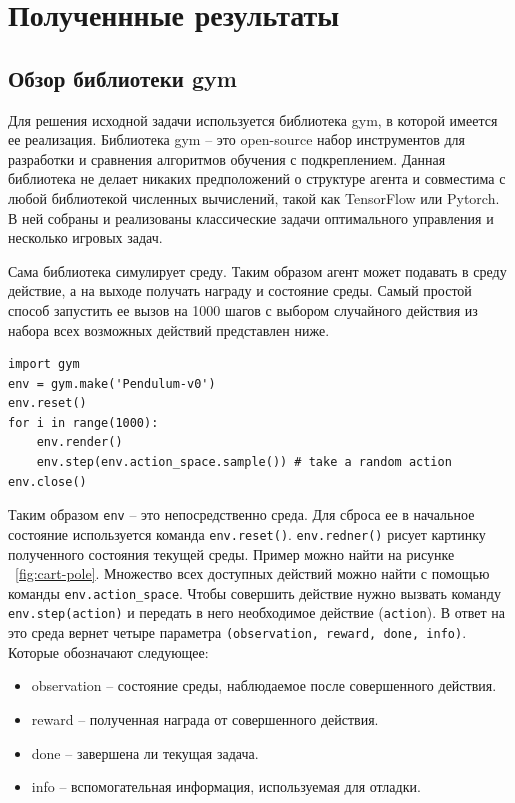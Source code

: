 \chapter{Полученнные результаты}\label{chap1}

\section{Обзор библиотеки gym}\label{1sec:optimal-control}

Для решения исходной задачи используется библиотека gym, в которой имеется ее реализация. Библиотека gym -- это open-source набор инструментов для разработки и сравнения алгоритмов обучения с подкреплением. Данная библиотека не делает никаких предположений о структуре агента и совместима с любой библиотекой численных вычислений, такой как TensorFlow или Pytorch. В ней собраны и реализованы классические задачи оптимального управления и несколько игровых задач. 

Сама библиотека симулирует среду. Таким образом агент может подавать в среду действие, а на выходе получать награду и состояние среды. Самый простой способ запустить ее вызов на 1000 шагов с выбором случайного действия из набора всех возможных действий представлен ниже. 

\begin{verbatim}
import gym 
env = gym.make('Pendulum-v0')
env.reset() 
for i in range(1000): 
    env.render() 
    env.step(env.action_space.sample()) # take a random action 
env.close()
\end{verbatim}

Таким образом \texttt{env} -- это непосредственно среда. Для сброса ее в начальное состояние используется команда \texttt{env.reset()}. \texttt{env.redner()} рисует картинку полученного состояния текущей среды. Пример можно найти на рисунке ~\ref{fig:cart-pole}. Множество всех доступных действий можно найти с помощью команды \texttt{env.action_space}. Чтобы совершить действие нужно вызвать команду \texttt{env.step(action)} и передать в него необходимое действие (\texttt{action}). В ответ на это среда вернет четыре параметра \texttt{(observation, reward, done, info)}. Которые обозначают следующее:
\begin{itemize}
	\item observation -- состояние среды, наблюдаемое после совершенного действия.
	\item reward -- полученная награда от совершенного действия.
	\item done -- завершена ли текущая задача.
	\item info -- вспомогательная информация, используемая для отладки. 
\end{itemize}
 \newpage


